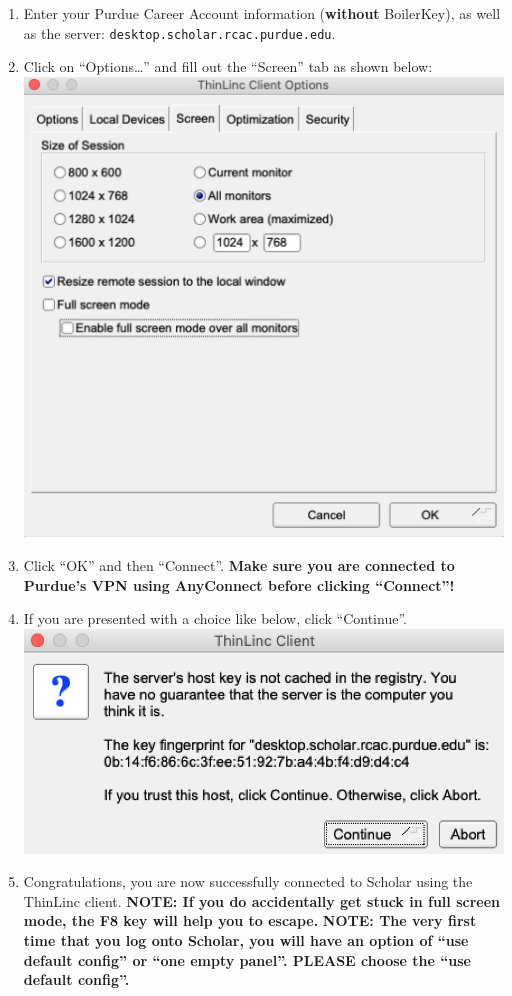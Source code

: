 \documentclass[
]{book}
\begin{document}
\begin{enumerate}
\item
  Enter your Purdue Career Account information (\textbf{without} BoilerKey), as well as the server: \texttt{desktop.scholar.rcac.purdue.edu}.
\item
  Click on ``Options\ldots{}'' and fill out the ``Screen'' tab as shown below:
  \includegraphics{images/thinlincoptions.png}
\item
  Click ``OK'' and then ``Connect''. \textbf{Make sure you are connected to Purdue's VPN using AnyConnect before clicking ``Connect''!}
\item
  If you are presented with a choice like below, click ``Continue''.
  \includegraphics{images/thinlincquestion.png}
\item
  Congratulations, you are now successfully connected to Scholar using the ThinLinc client.
  \textbf{NOTE: If you do accidentally get stuck in full screen mode, the F8 key will help you to escape.}
  \textbf{NOTE: The very first time that you log onto Scholar, you will have an option of ``use default config'' or ``one empty panel''. PLEASE choose the ``use default config''.}
\end{enumerate}
\end{document}
